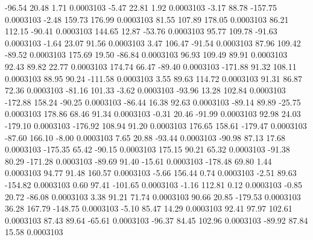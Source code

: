       -96.54       20.48        1.71     0.0003103
       -5.47       22.81        1.92     0.0003103
       -3.17       88.78     -157.75     0.0003103
       -2.48      159.73      176.99     0.0003103
       81.55      107.89      178.05     0.0003103
       86.21      112.15      -90.41     0.0003103
      144.65       12.87      -53.76     0.0003103
       95.77      109.78      -91.63     0.0003103
       -1.64       23.07       91.56     0.0003103
        3.47      106.47      -91.54     0.0003103
       87.96      109.42      -89.52     0.0003103
      175.69       19.50      -86.84     0.0003103
       96.93      109.49       89.91     0.0003103
       92.43       89.82       22.77     0.0003103
      174.74       66.47      -89.40     0.0003103
     -171.88       91.32      108.11     0.0003103
       88.95       90.24     -111.58     0.0003103
        3.55       89.63      114.72     0.0003103
       91.31       86.87       72.36     0.0003103
      -81.16      101.33       -3.62     0.0003103
      -93.96       13.28      102.84     0.0003103
     -172.88      158.24      -90.25     0.0003103
      -86.44       16.38       92.63     0.0003103
      -89.14       89.89      -25.75     0.0003103
      178.86       68.46       91.34     0.0003103
       -0.31       20.46      -91.99     0.0003103
       92.98       24.03     -179.10     0.0003103
     -176.92      108.94       91.20     0.0003103
      176.65      158.61     -179.47     0.0003103
      -87.60      166.10       -8.00     0.0003103
        7.65       20.88      -93.44     0.0003103
      -90.98       87.13       17.68     0.0003103
     -175.35       65.42      -90.15     0.0003103
      175.15       90.21       65.32     0.0003103
      -91.38       80.29     -171.28     0.0003103
      -89.69       91.40      -15.61     0.0003103
     -178.48       69.80        1.44     0.0003103
       94.77       91.48      160.57     0.0003103
       -5.66      156.44        0.74     0.0003103
       -2.51       89.63     -154.82     0.0003103
        0.60       97.41     -101.65     0.0003103
       -1.16      112.81        0.12     0.0003103
       -0.85       20.72      -86.08     0.0003103
        3.38       91.21       71.74     0.0003103
       90.66       20.85     -179.53     0.0003103
       36.28      167.79     -148.75     0.0003103
       -5.10       85.47       14.29     0.0003103
       92.41       97.97      102.61     0.0003103
       87.43       89.64      -65.61     0.0003103
      -96.37       84.45      102.96     0.0003103
      -89.92       87.84       15.58     0.0003103
